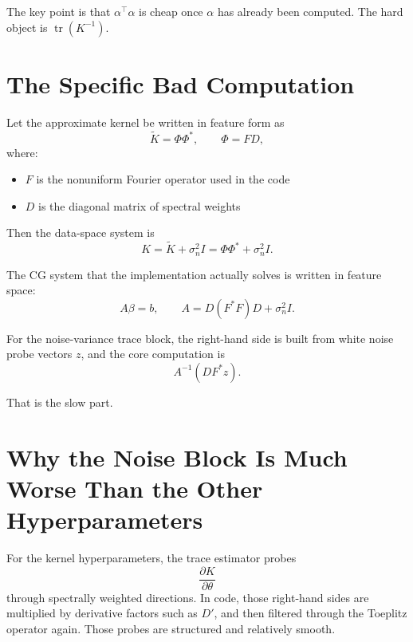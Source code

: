 \documentclass[11pt]{article}
\begin{document}
The key point is that $\alpha^\top \alpha$ is cheap once $\alpha$ has already
been computed. The hard object is $\operatorname{tr}(K^{-1})$.

\section*{The Specific Bad Computation}

Let the approximate kernel be written in feature form as
\begin{equation}
\widetilde K = \Phi \Phi^\ast,
\qquad
\Phi = F D,
\end{equation}
where:
\begin{itemize}
  \item $F$ is the nonuniform Fourier operator used in the code
  \item $D$ is the diagonal matrix of spectral weights
\end{itemize}

Then the data-space system is
\begin{equation}
K = \widetilde K + \sigma_n^2 I
=
\Phi \Phi^\ast + \sigma_n^2 I.
\end{equation}

The CG system that the implementation actually solves is written in feature
space:
\begin{equation}
A \beta = b,
\qquad
A = D(F^\ast F)D + \sigma_n^2 I.
\end{equation}

For the noise-variance trace block, the right-hand side is built from white
noise probe vectors $z$, and the core computation is
\begin{equation}
A^{-1}(D F^\ast z).
\end{equation}

That is the slow part.

\section*{Why the Noise Block Is Much Worse Than the Other Hyperparameters}

For the kernel hyperparameters, the trace estimator probes
\begin{equation}
\frac{\partial K}{\partial \theta}
\end{equation}
through spectrally weighted directions. In code, those right-hand sides are
multiplied by derivative factors such as $D'$, and then filtered through the
Toeplitz operator again. Those probes are structured and relatively smooth.
\end{document}

